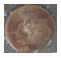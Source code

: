 \documentclass {udthesis}
\begin{document}
\begin{figure}
  \centering
  \begin{minipage}[c]{\textwidth}
    \centering
    \begin{subfigure}[]{0.25\textwidth}
	\includegraphics[width=\textwidth,natwidth=105,natheight=100]{dawkins_crop_resize}

\end{subfigure}
\end{minipage}
\end{figure}
\end{document}
